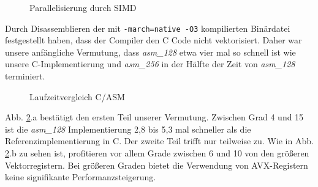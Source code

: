 \documentclass[course=erap]{aspdoc}
\begin{document}
\begin{figure}[h] 
    \centering
    \caption{Parallelisierung durch SIMD}%
    \label{fig:SIMD}%
\end{figure}

Durch Disassemblieren der mit \texttt{-march=native -O3} kompilierten Binärdatei festgestellt haben, dass der Compiler den C Code nicht vektorisiert. Daher war unsere anfängliche Vermutung, dass \textit{asm\_128} etwa vier mal so schnell ist wie unsere C-Implementierung und \textit{asm\_256} in der Hälfte der Zeit von \textit{asm\_128} terminiert.

\begin{figure}[h] 
    \centering
    \qquad
    \caption{Laufzeitvergleich C/ASM}%
    \label{fig:Laufzeitvergleich Speedup}%
 \end{figure}
 
 Abb. \ref{fig:Laufzeitvergleich Speedup}.a bestätigt den ersten Teil unserer Vermutung. Zwischen Grad 4 und 15 ist die \textit{asm\_128} Implementierung 2,8 bis 5,3 mal schneller als die Referenzimplementierung in C. Der zweite Teil trifft nur teilweise zu. Wie in Abb. \ref{fig:Laufzeitvergleich Speedup}.b zu sehen ist, profitieren vor allem Grade zwischen 6 und 10 von den größeren Vektorregistern. Bei größeren Graden bietet die Verwendung von AVX-Registern keine signifikante Performanzsteigerung.
 \FloatBarrier
\end{document}
